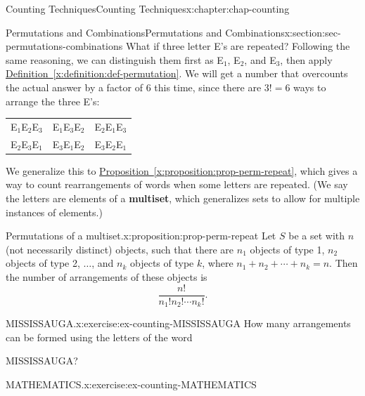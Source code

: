 \documentclass[oneside,10pt,]{book}
\newcommand{\tabularfont}{\relax}
\newcommand{\xreffont}{\relax}
\newcommand{\terminology}[1]{\textbf{#1}}
\numberwithin{equation}{section}
\begin{document}
\begin{chapterptx}{Counting Techniques}{}{Counting Techniques}{}{}{x:chapter:chap-counting}
\begin{sectionptx}{Permutations and Combinations}{}{Permutations and Combinations}{}{}{x:section:sec-permutations-combinations}
What if three letter E's are repeated? Following the same reasoning, we can distinguish them first as E\(_1\), E\(_2\), and E\(_3\), then apply \hyperref[x:definition:def-permutation]{Definition~{\xreffont\ref{x:definition:def-permutation}}}. We will get a number that overcounts the actual answer by a factor of 6 this time, since there are \(3! = 6\) ways to arrange the three E's:%
\begin{sidebyside}{1}{0.1}{0.1}{0}%
\begin{sbspanel}{0.8}%
{\centering%
{\tabularfont%
\begin{tabular}{lll}
E\(_1\)E\(_2\)E\(_3\)&E\(_1\)E\(_3\)E\(_2\)&E\(_2\)E\(_1\)E\(_3\)\tabularnewline[0pt]
E\(_2\)E\(_3\)E\(_1\)&E\(_3\)E\(_1\)E\(_2\)&E\(_3\)E\(_2\)E\(_1\)
\end{tabular}
}%
\par}
\end{sbspanel}%
\end{sidebyside}%
\par
We generalize this to \hyperref[x:proposition:prop-perm-repeat]{Proposition~{\xreffont\ref{x:proposition:prop-perm-repeat}}}, which gives a way to count rearrangements of words when some letters are repeated. (We say the letters are elements of a \terminology{multiset}, which generalizes sets to allow for multiple instances of elements.)%
\begin{proposition}{Permutations of a multiset.}{}{x:proposition:prop-perm-repeat}%
Let \(S\) be a set with \(n\) (not necessarily distinct) objects, such that there are \(n_1\) objects of type 1, \(n_2\) objects of type 2, \(\ldots\), and \(n_k\) objects of type \(k\), where \(n_1 + n_2 + \cdots + n_k = n\). Then the number of arrangements of these objects is%
\begin{equation*}
\dfrac{n!}{n_1! n_2! \cdots n_k!}\text{.}
\end{equation*}
%
\end{proposition}
\begin{inlineexercise}{MISSISSAUGA.}{x:exercise:ex-counting-MISSISSAUGA}%
How many arrangements can be formed using the letters of the word%
\begin{sidebyside}{1}{0.375}{0.375}{0}%
\begin{sbspanel}{0.25}%
MISSISSAUGA?%
\end{sbspanel}%
\end{sidebyside}%
\end{inlineexercise}
\begin{inlineexercise}{MATHEMATICS.}{x:exercise:ex-counting-MATHEMATICS}%

\end{inlineexercise}
\end{sectionptx}
\end{chapterptx}
\end{document}
